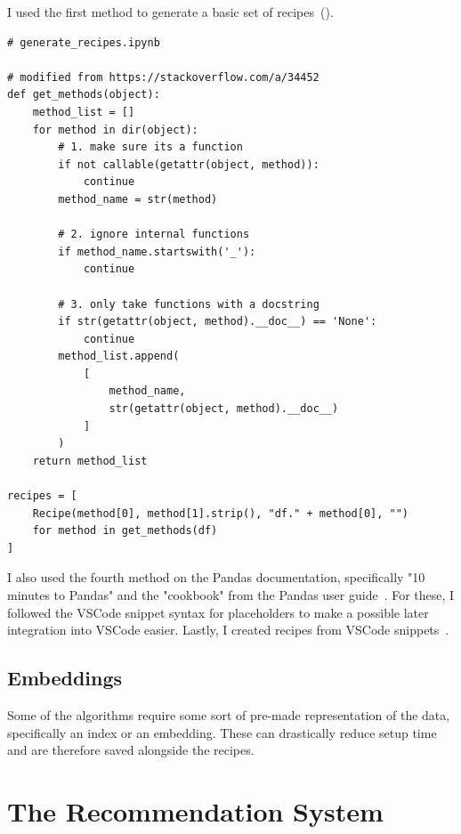\documentclass[
     12pt,                    %
     a4paper,             %
     BCOR=10mm,     %
     DIV=14,                 %
     listof=totoc,                    %
     bibliography=totoc,       %
     index=totoc,              %
     twoside,
     headsepline
     ]{scrreprt}
\begin{document}
I used the first method to generate a basic set of recipes~().

\begin{listing}[htb]
	\begin{verbatim}
# generate_recipes.ipynb

# modified from https://stackoverflow.com/a/34452
def get_methods(object):
	method_list = []
	for method in dir(object):
		# 1. make sure its a function
		if not callable(getattr(object, method)):
			continue
		method_name = str(method)
		
		# 2. ignore internal functions
		if method_name.startswith('_'):
			continue
		
		# 3. only take functions with a docstring
		if str(getattr(object, method).__doc__) == 'None':
			continue
		method_list.append(
			[
				method_name,
				str(getattr(object, method).__doc__)
			]
		)
	return method_list

recipes = [
	Recipe(method[0], method[1].strip(), "df." + method[0], "")
	for method in get_methods(df)
]
	\end{verbatim}
	\caption[Generate Basic Recipes]{Generate Basic Recipes.\label{list:genrecepies}}
\end{listing}

I also used the fourth method on the Pandas documentation, specifically "10 minutes to Pandas" and the "cookbook" from the Pandas user guide~\cite{pandaswebsite}. For these, I followed the VSCode snippet syntax for placeholders to make a possible later integration into VSCode easier.
Lastly, I created recipes from VSCode snippets~\cite{basicpandassnippets}.

\clearpage

\subsection{Embeddings}

Some of the algorithms require some sort of pre-made representation of the data, specifically an index or an embedding. These can drastically reduce setup time and are therefore saved alongside the recipes.

\section{The Recommendation System}
\end{document}
